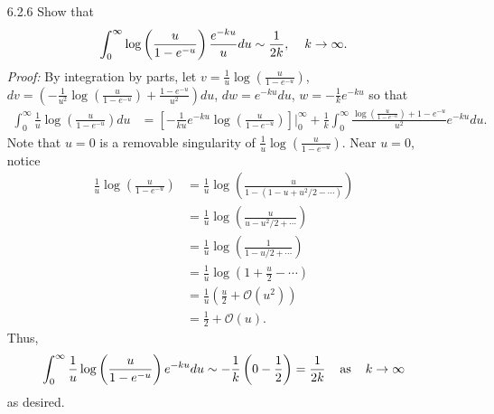 \documentclass{article}
\begin{document}
\begin{itemize}
    \item[6.2.6] Show that
    \[\int_0^{\infty} \log\left(\frac{u}{1 - e^{-u}}\right)\frac{e^{-ku}}{u}du \sim \frac{1}{2k}, \hspace{0.4cm} k \to \infty.\]
    \textit{Proof:} By integration by parts, let $v = \frac{1}{u}\log\left(\frac{u}{1-e^{-u}}\right)$, $dv = \left(-\frac{1}{u^2}\log\left(\frac{u}{1-e^{-u}}\right) + \frac{1-e^{-u}}{u^2}\right)du$, $dw = e^{-ku}du$, $w = -\frac{1}{k}e^{-ku}$ so that 
    \begin{align*}
        \int_0^{\infty} \frac{1}{u}\log\left(\frac{u}{1 - e^{-u}}\right)du &= \left[-\frac{1}{ku}e^{-ku}\log\left(\frac{u}{1-e^{-u}}\right)\right]\bigg|_0^{\infty} + \frac{1}{k}\int_0^{\infty} \frac{\log\left(\tfrac{u}{1-e^{-u}}\right)+1-e^{-u}}{u^2}e^{-ku}du.
    \end{align*}
    Note that $u = 0$ is a removable singularity of $\tfrac{1}{u}\log\left(\frac{u}{1-e^{-u}}\right)$. Near $u = 0$, notice
    \begin{align*}
        \frac{1}{u}\log\left(\frac{u}{1-e^{-u}}\right) &= \frac{1}{u}\log\left(\frac{u}{1 - (1 - u + u^2/2 - \cdots)}\right)\\
        &= \frac{1}{u}\log\left(\frac{u}{u - u^2/2 + \cdots}\right)\\
        &= \frac{1}{u}\log\left(\frac{1}{1 - u/2 + \cdots}\right)\\
        &= \frac{1}{u}\log\left(1 + \frac{u}{2} - \cdots\right)\\
        &= \frac{1}{u}\left(\frac{u}{2} + \mathcal{O}(u^2)\right)\\
        &= \frac{1}{2} + \mathcal{O}(u).
    \end{align*}
    Thus, 
    \[\int_0^{\infty}\frac{1}{u}\log\left(\frac{u}{1-e^{-u}}\right)e^{-ku}du \sim -\frac{1}{k}\left(0 - \frac{1}{2}\right) = \frac{1}{2k} \hspace{0.4cm} \text{as} \hspace{0.4cm} k \to \infty\]
    as desired.

    \pagebreak


\end{itemize}
\end{document}
